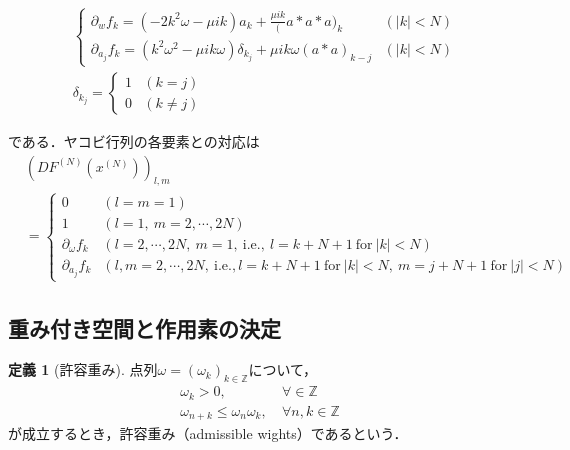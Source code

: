 \documentclass[11pt,a4paper]{jsarticle}
\theoremstyle{definition}
\newtheorem{dfn}{定義}
\begin{document}
\begin{align*}
   & \begin{cases}
       \partial_w f_k = (-2k^2\omega - \mu ik)a_k + \frac{\mu ik}(a*a*a)_k                     & (|k|<N) \\
       \partial_{a_j} f_k = (k^2\omega^2 - \mu ik\omega)\delta_{k_j} + \mu ik\omega(a*a)_{k-j} & (|k|<N)
     \end{cases}
  \\
   & \delta_{k_j} = \begin{cases}
                      1 & (k=j)     \\
                      0 & (k\neq j)
                    \end{cases}
\end{align*}

である．ヤコビ行列の各要素との対応は
\begin{align*}
   & \left(DF^{(N)}\left(x^{(N)}\right)\right)_{l,m}                                                                                        \\
   & = \begin{cases}
         0                   & \left(l=m=1\right)                                                                                             \\
         1                   & \left(l=1,\ m= 2,\cdots,2N\right)                                                                              \\
         \partial_\omega f_k & \left(l=2,\cdots,2N,\ m=1, \ \mathrm{i.e.},\ l=k+N+1 \ \mathrm{for} \ |k|<N\right)                             \\
         \partial_{a_j}f_k   & \left(l,m=2,\cdots,2N, \ \mathrm{i.e.}, l=k+N+1 \ \mathrm{for} \ |k|<N,\ m=j+N+1 \ \mathrm{for} \ |j|<N\right)
       \end{cases}
\end{align*}


\subsection{重み付き空間と作用素の決定}
\begin{dfn}[許容重み]
  点列$\omega = \left(\omega_k\right)_{k\in\mathbb{Z}}$について，
  \begin{align}
    \omega_k>0,\                           & \forall \in \mathbb{Z}   \\
    \omega_{n+k} \leq \omega_n \omega_k,\  & \forall n,k\in\mathbb{Z}
  \end{align}
  が成立するとき，許容重み（admissible wights）であるという．
\end{dfn}
\end{document}
